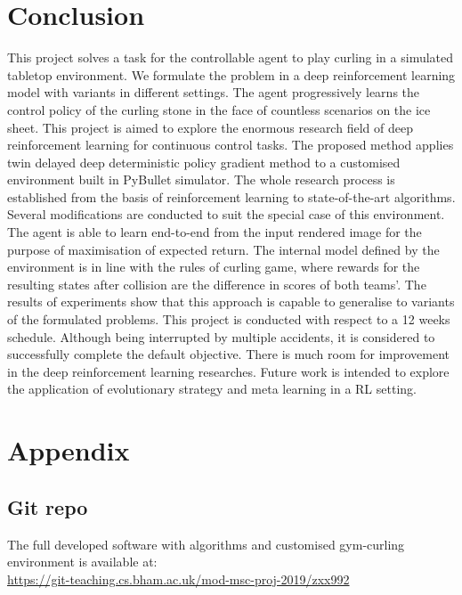 \documentclass[oneside,11pt,a4paper]{article}
\begin{document}
\section{Conclusion}
This project solves a task for the controllable agent to play curling in a simulated tabletop environment. We formulate the problem in a deep reinforcement learning model with variants in different settings. The agent progressively learns the control policy of the curling stone in the face of countless scenarios on the ice sheet. This project is aimed to explore the enormous research field of deep reinforcement learning for continuous control tasks. The proposed method applies twin delayed deep deterministic policy gradient method to a customised environment built in PyBullet simulator. The whole research process is established from the basis of reinforcement learning to state-of-the-art algorithms. Several modifications are conducted to suit the special case of this environment. The agent is able to learn end-to-end from the input rendered image for the purpose of maximisation of expected return. The internal model defined by the environment is in line with the rules of curling game, where rewards for the resulting states after collision are the difference in scores of both teams'. The results of experiments show that this approach is capable to generalise to variants of the formulated problems. This project is conducted with respect to a 12 weeks schedule. Although being interrupted by multiple accidents, it is considered to successfully complete the default objective. There is much room for improvement in the deep reinforcement learning researches. Future work is intended to explore the application of evolutionary strategy and meta learning in a RL setting.
\vspace{1cm}

\section{Appendix}
\subsection{Git repo}
The full developed software with algorithms and customised gym-curling environment is available at:
\\ \url{https://git-teaching.cs.bham.ac.uk/mod-msc-proj-2019/zxx992}
\vspace{1cm}
\end{document}
